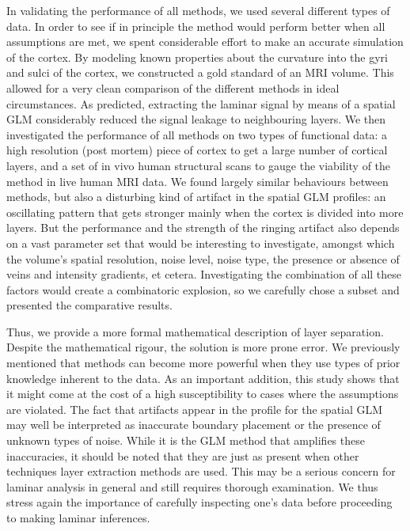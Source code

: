 In validating the performance of all methods, we used several different types of data. In order to see if in principle the method would perform better when all assumptions are met, we spent considerable effort to make an accurate simulation of the cortex. By modeling known properties about the curvature into the gyri and sulci of the cortex, we constructed a gold standard of an MRI volume. This allowed for a very clean comparison of the different methods in ideal circumstances. As predicted, extracting the laminar signal by means of a spatial GLM considerably reduced the signal leakage to neighbouring layers. We then investigated the performance of all methods on two types of functional data: a high resolution (post mortem) piece of cortex to get a large number of cortical layers, and a set of in vivo human structural scans to gauge the viability of the method in live human MRI data. We found largely similar behaviours between methods, but also a disturbing kind of artifact in the spatial GLM profiles: an oscillating pattern that gets stronger mainly when the cortex is divided into more layers. But the performance and the strength of the ringing artifact also depends on a vast parameter set that would be interesting to investigate, amongst which the volume's spatial resolution, noise level, noise type, the presence or absence of veins and intensity gradients, et cetera. Investigating the combination of all these factors would create a combinatoric explosion, so we carefully chose a subset and presented the comparative results.

Thus, we provide a more formal mathematical description of layer separation. Despite the mathematical rigour, the solution is more prone error. We previously mentioned that methods can become more powerful when they use types of prior knowledge inherent to the data. As an important addition, this study shows that it might come at the cost of a high susceptibility to cases where the assumptions are violated. The fact that artifacts appear in the profile for the spatial GLM may well be interpreted as inaccurate boundary placement or the presence of unknown types of noise. While it is the GLM method that amplifies these inaccuracies, it should be noted that they are just as present when other techniques layer extraction methods are used. This may be a serious concern for laminar analysis in general and still requires thorough examination. We thus stress again the importance of carefully inspecting one's data before proceeding to making laminar inferences. 

